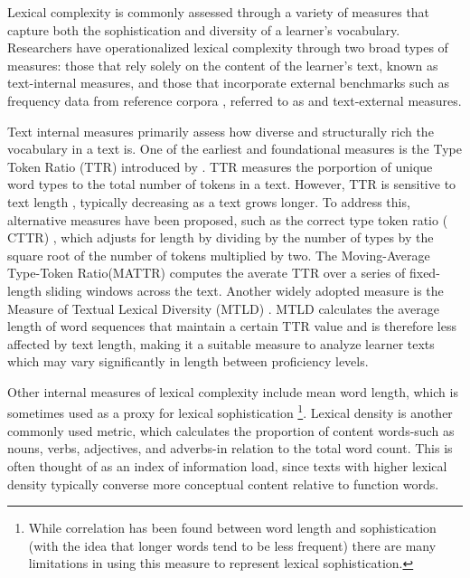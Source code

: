 
Lexical complexity is commonly assessed through a variety of measures that capture both the sophistication and
diversity of a learner's vocabulary. Researchers have operationalized lexical complexity through two broad types of
measures: those that rely solely on the content of the learner's text, known as
text-internal measures, and those that incorporate external benchmarks such as frequency data from reference
corpora , referred to as and text-external measures\citep{Butle2012}.

Text internal measures primarily assess how diverse and structurally rich the vocabulary in a text is.
One of the
earliest
and
foundational measures is the Type Token Ratio (TTR) introduced by \citet{Templin1957}. TTR measures the porportion of
unique word types to the total number of tokens in a text. However, TTR is sensitive to text
length
\citep{koizumi2012}, typically decreasing as a text grows longer. To address this, alternative measures have been
proposed, such as the correct type token ratio (
CTTR)
\citep{Carroll1964}, which adjusts for length by dividing by the number of types by the square root of the
number of tokens multiplied by two. The Moving-Average Type-Token Ratio(MATTR)\citep{Covington2010} computes the
averate TTR over a series of fixed-length sliding windows across the text. Another widely
adopted measure is the Measure of Textual Lexical Diversity (MTLD)
\citep{McCarthy2010}. MTLD
calculates the average length of word
sequences that maintain a certain TTR value and is therefore less affected by text length, making it a suitable
measure to analyze learner texts which may vary significantly in length between proficiency levels.

Other internal measures
 of lexical complexity include
mean word length, which is sometimes used as a proxy for lexical sophistication
\footnote{ While correlation has been found between word length and sophistication (with the idea that longer words tend to be less frequent) there are many limitations in using this measure to represent lexical sophistication.}. Lexical density is another commonly used metric, which calculates the proportion
of content words-such as nouns, verbs, adjectives, and adverbs-in relation to the total word count. This is often
thought of as an index of information load, since texts with higher lexical density typically converse more
conceptual content relative to function words.

